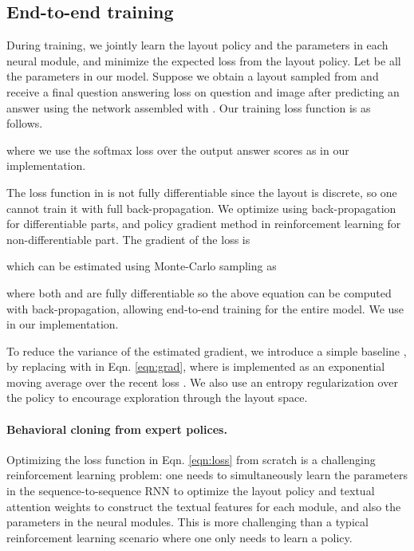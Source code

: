 \documentclass[10pt,twocolumn,letterpaper]{article}
\begin{document}
\subsection{End-to-end training}\label{sec:training}

During training, we jointly learn the layout policy  and the parameters in each neural module, and minimize the expected loss from the layout policy. Let  be all the parameters in our model. Suppose we obtain a layout  sampled from  and receive a final question answering loss  on question  and image  after predicting an answer using the network assembled with . Our training loss function  is as follows.

where we use the softmax loss over the output answer scores as  in our implementation.

The loss function in  is not fully differentiable since the layout  is discrete, so one cannot train it with full back-propagation. We optimize  using back-propagation for differentiable parts, and policy gradient method in reinforcement learning for non-differentiable part. The gradient  of the loss  is

which can be estimated using Monte-Carlo sampling as

where both  and  are fully differentiable so the above equation can be computed with back-propagation, allowing end-to-end training for the entire model. We use  in our implementation.

To reduce the variance of the estimated gradient, we introduce a simple baseline , by replacing  with  in Eqn. \ref{eqn:grad}, where  is implemented as an exponential moving average over the recent loss . We also use an entropy regularization  over the policy  to encourage exploration through the layout space.

\paragraph{Behavioral cloning from expert polices.}
Optimizing the loss function in Eqn. \ref{eqn:loss} from scratch is a challenging reinforcement learning problem: one needs to simultaneously learn the parameters in the sequence-to-sequence RNN to optimize the layout policy and textual attention weights to construct the textual features  for each module, and also the parameters in the neural modules. This is more challenging than a typical reinforcement learning scenario where one only needs to learn a policy.
\end{document}
